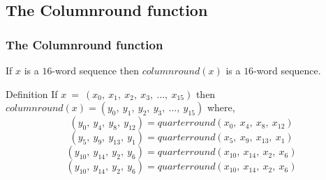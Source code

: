\subsection{The Columnround function}

\begin{frame}
\frametitle{The Columnround function}

If $x$ is a $16$-word sequence then $columnround(x)$ is a $16$-word sequence. 
\begin{block}{Definition}
If $x \ = \ (x_0, \ x_1, \ x_2, \ x_3, \ \ldots, \ x_{15})$ then ${columnround(x)} = (y_0, \ y_1, \ y_2, \ y_3, \ \ldots, \ y_{15})$ where, 
$$(y_0, \ y_4, \ y_8, \ y_{12}) = quarterround (x_0, \ x_4, \ x_8, \ x_{12})$$
$$(y_5, \ y_9, \ y_13, \ y_1) = quarterround (x_5, \ x_9, \ x_{13}, \ x_1)$$
$$(y_{10}, \ y_{14}, \ y_2, \ y_6) = quarterround (x_{10}, \ x_{14}, \ x_2, \ x_6)$$
$$(y_{10}, \ y_{14}, \ y_{2}, \ y_6) = quarterround (x_{10}, \ x_{14}, \ x_2, \ x_6)$$
\end{block}
\end{frame}
